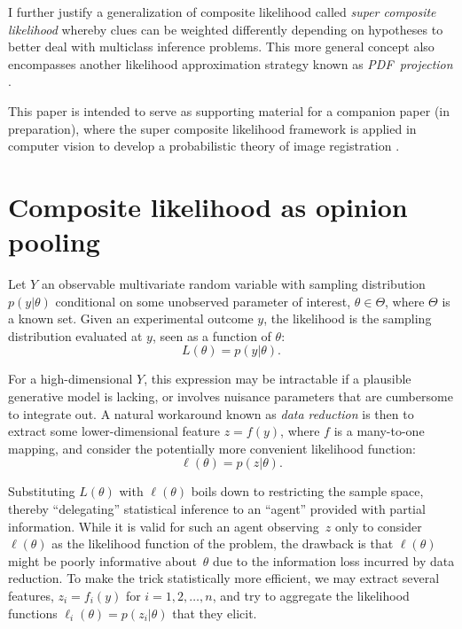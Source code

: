 \documentclass[english]{scrartcl}
\begin{document}
I further justify a generalization of composite likelihood called {\em super composite likelihood} whereby clues can be weighted differently depending on hypotheses to better deal with multiclass inference problems. This more general concept also encompasses another likelihood approximation strategy known as {\em PDF~projection} \cite{Baggenstoss-03,Minka-04,Baggenstoss-15}.

This paper is intended to serve as supporting material for a companion paper (in preparation), where the super composite likelihood framework is applied in computer vision to develop a probabilistic theory of image registration \cite{Viola-97}.


\section{Composite likelihood as opinion pooling}
\label{sec:pool}

Let $Y$ an observable multivariate random variable with sampling distribution $p(y|\theta)$ conditional on some unobserved parameter of interest, $\theta\in\Theta$, where $\Theta$ is a known set. Given an experimental outcome $y$, the likelihood is the sampling distribution evaluated at $y$, seen as a function of $\theta$:
$$
L(\theta) = p(y|\theta)
.
$$

For a high-dimensional $Y$, this expression may be intractable if a plausible generative model is lacking, or involves nuisance parameters that are cumbersome to integrate out. A natural workaround known as {\em data reduction} is then to extract some lower-dimensional feature $z=f(y)$, where $f$ is a many-to-one mapping, and consider the potentially more convenient likelihood function:
$$
\ell(\theta) = p(z|\theta)
.
$$

Substituting $L(\theta)$ with $\ell(\theta)$ boils down to restricting the sample space, thereby  ``delegating'' statistical inference to an ``agent'' provided with partial information. While it is valid for such an agent observing~$z$ only to consider $\ell(\theta)$ as the likelihood function of the problem, the drawback is that $\ell(\theta)$ might be poorly informative about~$\theta$ due to the information loss incurred by data reduction. To make the trick statistically more efficient, we may extract several features, $z_i=f_i(y)$ for $i=1,2,\ldots,n$, and try to aggregate the likelihood functions $\ell_i(\theta) = p(z_i|\theta)$ that they elicit.
\end{document}
